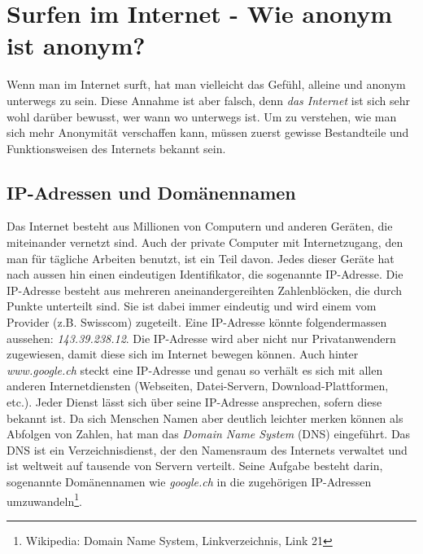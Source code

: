\section{Surfen im Internet - Wie anonym ist anonym?}
Wenn man im Internet surft, hat man vielleicht das Gefühl, alleine und anonym unterwegs zu sein.
Diese Annahme ist aber falsch, denn \textit{das Internet} ist sich sehr wohl darüber bewusst, wer wann wo unterwegs ist. Um zu verstehen, wie man sich  mehr Anonymität verschaffen kann, müssen zuerst gewisse Bestandteile und Funktionsweisen des Internets bekannt sein.

\subsection{IP-Adressen und Domänennamen}
Das Internet besteht aus Millionen von Computern und anderen Geräten, die miteinander vernetzt sind.
Auch der private Computer mit Internetzugang, den man für tägliche Arbeiten benutzt, ist ein Teil davon.
Jedes dieser Geräte hat nach aussen hin einen eindeutigen Identifikator, die sogenannte IP-Adresse.
Die IP-Adresse besteht aus mehreren aneinandergereihten Zahlenblöcken, die durch Punkte unterteilt sind.
Sie ist dabei immer eindeutig und wird einem vom Provider (z.B. Swisscom) zugeteilt.
Eine IP-Adresse könnte folgendermassen aussehen: \textit{143.39.238.12}.
Die IP-Adresse wird aber nicht nur Privatanwendern zugewiesen, damit diese sich im Internet bewegen können.
Auch hinter \textit{www.google.ch} steckt eine IP-Adresse und genau so verhält es sich mit allen anderen Internetdiensten (Webseiten, Datei-Servern, Download-Plattformen, etc.).
Jeder Dienst lässt sich über seine IP-Adresse ansprechen, sofern diese bekannt ist.
Da sich Menschen Namen aber deutlich leichter merken können als Abfolgen von Zahlen, hat man das \textit{Domain Name System} (DNS) eingeführt.
Das DNS ist ein Verzeichnisdienst, der den Namensraum des Internets verwaltet und ist weltweit auf tausende von Servern verteilt.
Seine Aufgabe besteht darin, sogenannte Domänennamen wie \textit{google.ch} in die zugehörigen IP-Adressen umzuwandeln\footnote{Wikipedia: Domain Name System, Linkverzeichnis, Link 21}.

